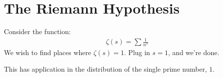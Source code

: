 \setcounter{section}{0}

\section{The Riemann Hypothesis}
Consider the function:
\begin{align*}
  \zeta(s) = \sum \frac{1}{n^s}
\end{align*}
We wish to find places where $\zeta(s) = 1$.
Plug in $s=1$, and we're done.

This has application in 
the distribution of the single 
prime number, $1$.
